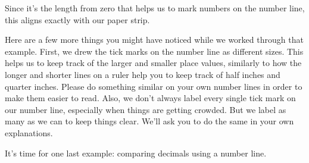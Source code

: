 \documentclass{ximera}
\begin{document}
\begin{example}
\begin{center}
\end{center}
Since it's the length from zero that helps us to mark numbers on the number line, this aligns exactly with our paper strip.

\end{example}

Here are a few more things you might have noticed while we worked through that example. First, we drew the tick marks on the number line as different sizes. This helps us to keep track of the larger and smaller place values, similarly to how the longer and shorter lines on a ruler help you to keep track of half inches and quarter inches. Please do something similar on your own number lines in order to make them easier to read. Also, we don't always label every single tick mark on our number line, especially when things are getting crowded. But we label as many as we can to keep things clear. We'll ask you to do the same in your own explanations.

It's time for one last example: comparing decimals using a number line.
\end{document}
